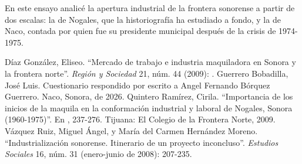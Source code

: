 \documentclass[12pt]{article}
\begin{document}
En este ensayo analicé la apertura industrial de la frontera sonorense a partir de dos escalas: la de Nogales, que la historiografía ha estudiado a fondo, y la de Naco, contada por quien fue su presidente municipal después de la crisis de 1974-1975. 


\begin{bibliografia}
 Díaz González, Eliseo. \enquote{Mercado de trabajo e industria maquiladora en Sonora y la frontera norte}. \emph{Región y Sociedad} 21, núm. 44 (2009): .
 Guerrero Bobadilla, José Luis. Cuestionario respondido por escrito a Angel Fernando Bórquez Guerrero. Naco, Sonora,  de 2026.
 Quintero Ramírez, Cirila. \enquote{Importancia de los inicios de la maquila en la conformación industrial y laboral de Nogales, Sonora (1960-1975)}. En , 237-276. Tijuana: El Colegio de la Frontera Norte, 2009.
 Vázquez Ruiz, Miguel Ángel, y María del Carmen Hernández Moreno. \enquote{Industrialización sonorense. Itinerario de un proyecto inconcluso}. \emph{Estudios Sociales} 16, núm. 31 (enero-junio de 2008): 207-235.
\end{bibliografia}
\end{document}
